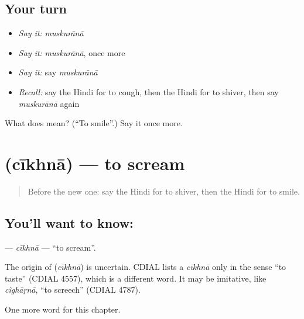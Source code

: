 \subsection*{Your turn}
\begin{itemize}
\raggedright
  \item \emph{Say it:} \emph{muskurānā}
  \item \emph{Say it:} \emph{muskurānā}, once more
  \item \emph{Say it:} say \emph{muskurānā}
  \item \emph{Recall:} say the Hindi for to cough, then the Hindi for to shiver, then say \emph{muskurānā} again
\end{itemize}

\begin{tcolorbox}[breakable,colback=teal!4,colframe=teal!35!black,title={Before you move on}]
What does  mean? (\textquotedblleft{}To smile\textquotedblright{}.) Say it once more.
\end{tcolorbox}
\section[\texorpdfstring{\hi{चीखना} (cīkhnā)}{चीखना (cīkhnā)}]{ (cīkhnā) — to scream}

\label{lesson:HI-C232-cikhna}



\begin{quote}
Before the new one: say the Hindi for to shiver, then the Hindi for to smile.
\end{quote}

\subsection*{You'll want to know: }
\textbf{} — \emph{cīkhnā} — \textquotedblleft{}to scream\textquotedblright{}.

\begin{cousinweb}
The origin of \textbf{} (\emph{cīkhnā}) is uncertain. CDIAL lists a \emph{cīkhnā} only in the sense \textquotedblleft{}to taste\textquotedblright{} (CDIAL 4557), which is a different word. It may be imitative, like \emph{cĩghāṛnā}, \textquotedblleft{}to screech\textquotedblright{} (CDIAL 4787).
\end{cousinweb}

\begin{grammarlens}[title={What you've built}]
One more word for this chapter.
\end{grammarlens}

